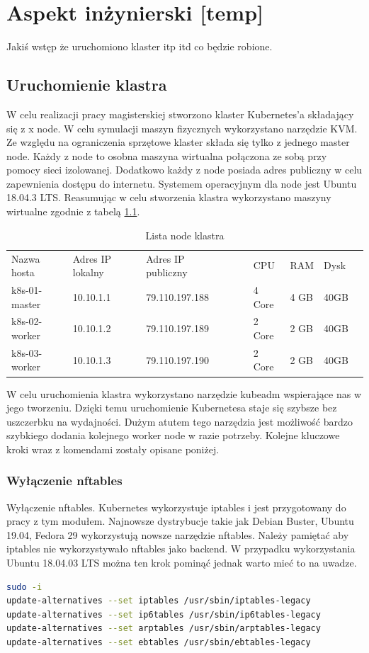 \documentclass[pl,final,oneside]{mgr} %
\begin{document}
\chapter{Aspekt inżynierski [temp]}
Jakiś wstęp że uruchomiono klaster itp itd co będzie robione.

\section{Uruchomienie klastra}
W celu realizacji pracy magisterskiej stworzono klaster Kubernetes'a składający się z x node. W celu symulacji maszyn fizycznych wykorzystano narzędzie KVM. Ze względu na ograniczenia sprzętowe klaster składa się tylko z jednego master node. Każdy z node to osobna maszyna wirtualna połączona ze sobą przy pomocy sieci izolowanej. Dodatkowo każdy z node posiada adres publiczny w celu zapewnienia dostępu do internetu. Systemem operacyjnym dla node jest Ubuntu 18.04.3 LTS. Reasumując w celu stworzenia klastra wykorzystano maszyny wirtualne zgodnie z tabelą \ref{tab:kvm_node}.

\begin{table}[h!]
	\begin{tabular}{lllllllll}
		Nazwa hosta   & Adres IP lokalny & Adres IP publiczny &  &  & CPU    & RAM  & Dysk &  \\
		k8s-01-master & 10.10.1.1        & 79.110.197.188     &  &  & 4 Core & 4 GB & 40GB &  \\
		k8s-02-worker & 10.10.1.2        & 79.110.197.189     &  &  & 2 Core & 2 GB & 40GB &  \\
		k8s-03-worker & 10.10.1.3        & 79.110.197.190     &  &  & 2 Core & 2 GB & 40GB & 
	\end{tabular}
	\label{tab:kvm_node}
	\caption{Lista node klastra}
\end{table}

W celu uruchomienia klastra wykorzystano narzędzie kubeadm wspierające nas w jego tworzeniu. Dzięki temu uruchomienie Kubernetesa staje się szybsze bez uszczerbku na wydajności. Dużym atutem tego narzędzia jest możliwość bardzo szybkiego dodania kolejnego worker node w razie potrzeby. Kolejne kluczowe kroki wraz z komendami zostały opisane poniżej.

\subsection{Wyłączenie nftables}
Wyłączenie nftables. Kubernetes wykorzystuje iptables i jest przygotowany do pracy z tym modułem. Najnowsze dystrybucje takie jak Debian Buster, Ubuntu 19.04, Fedora 29 wykorzystują nowsze narzędzie nftables. Należy pamiętać aby iptables nie wykorzystywało nftables jako backend. W przypadku wykorzystania Ubuntu 18.04.03 LTS można ten krok pominąć jednak warto mieć to na uwadze.
\begin{lstlisting}[language=Bash]
sudo -i
update-alternatives --set iptables /usr/sbin/iptables-legacy
update-alternatives --set ip6tables /usr/sbin/ip6tables-legacy
update-alternatives --set arptables /usr/sbin/arptables-legacy
update-alternatives --set ebtables /usr/sbin/ebtables-legacy
\end{lstlisting}
\end{document}
